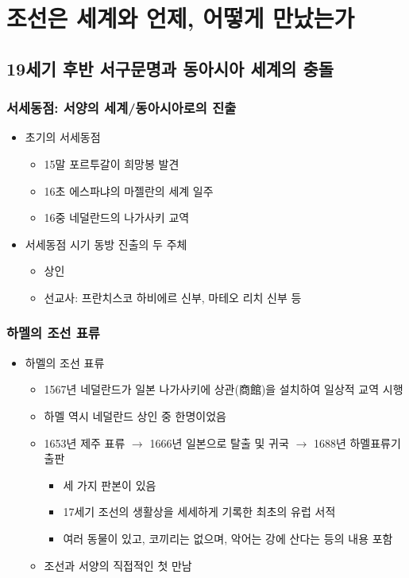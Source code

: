 \section{조선은 세계와 언제, 어떻게 만났는가}

\subsection{19세기 후반 서구문명과 동아시아 세계의 충돌}

\subsubsection*{서세동점: 서양의 세계/동아시아로의 진출}
\begin{itemize}
    \item 초기의 서세동점

    \begin{itemize}
        \item 15말 포르투갈이 희망봉 발견
        \item 16초 에스파냐의 마젤란의 세계 일주
        \item 16중 네덜란드의 나가사키 교역
    \end{itemize}

    \item 서세동점 시기 동방 진출의 두 주체
    \begin{itemize}
        \item 상인
        \item 선교사: 프란치스코 하비에르 신부, 마테오 리치 신부 등
    \end{itemize}
\end{itemize}

\subsubsection*{하멜의 조선 표류}
\begin{itemize}
    \item 하멜의 조선 표류
    \begin{itemize}
        \item 1567년 네덜란드가 일본 나가사키에 상관(商館)을 설치하여 일상적 교역 시행
        \item 하멜 역시 네덜란드 상인 중 한명이었음
        \item 1653년 제주 표류 $\rightarrow$ 1666년 일본으로 탈출 및 귀국 $\rightarrow$ 1688년 하멜표류기 출판
        \begin{itemize}
            \item 세 가지 판본이 있음
            \item 17세기 조선의 생활상을 세세하게 기록한 최초의 유럽 서적
            \item 여러 동물이 있고, 코끼리는 없으며, 악어는 강에 산다는 등의 내용 포함
        \end{itemize}
        \item 조선과 서양의 직접적인 첫 만남
    \end{itemize}
\end{itemize}

